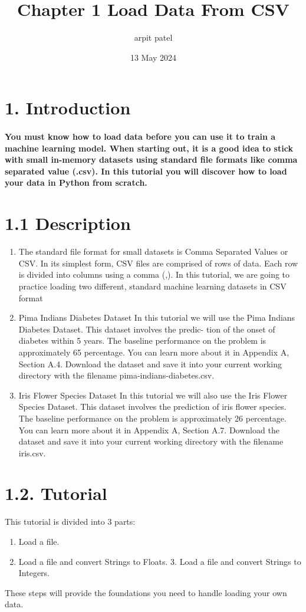\documentclass[12pt]{article}
\title{\textbf{Chapter 1 Load Data From CSV}}
\author{arpit patel }
\date{13 May 2024}
\begin{document}
\maketitle
\section*{1. Introduction}
\paragraph{You must know how to load data before you can use it to train a machine learning model. When starting out, it is a good idea to stick with small in-memory datasets using standard file formats like comma separated value (.csv). In this tutorial you will discover how to load your data in Python from scratch.}
\section*{1.1 Description}
\begin{enumerate}
    \item The standard file format for small datasets is Comma Separated Values or CSV. In its simplest form, CSV files are comprised of rows of data. Each row is divided into columns using a comma (,). In this tutorial, we are going to practice loading two different, standard machine learning datasets in CSV format
    \item Pima Indians Diabetes Dataset In this tutorial we will use the Pima Indians Diabetes Dataset. This dataset involves the predic- tion of the onset of diabetes within 5 years. The baseline performance on the problem is approximately 65 percentage. You can learn more about it in Appendix A, Section A.4. Download the dataset and save it into your current working directory with the filename pima-indians-diabetes.csv. 
    \item Iris Flower Species Dataset In this tutorial we will also use the Iris Flower Species Dataset. This dataset involves the prediction of iris flower species. The baseline performance on the problem is approximately 26 percentage. You can learn more about it in Appendix A, Section A.7. Download the dataset and save it into your current working directory with the filename iris.csv.
\end{enumerate}
\section*{1.2. Tutorial }
This tutorial is divided into 3 parts:
\begin{enumerate}
    \item Load a file.
    \item Load a file and convert Strings to Floats. 3. Load a file and convert Strings to Integers.
    
\end{enumerate}
These steps will provide the foundations you need to handle loading your own data.
\end{document}
